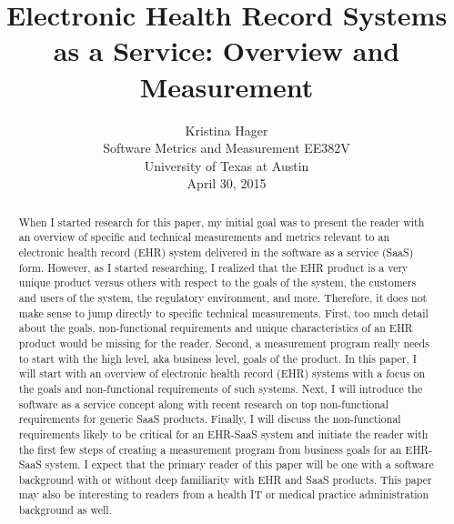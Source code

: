 \documentclass[10pt]{article}
\begin{document}
\title{Electronic Health Record Systems as a Service: Overview and Measurement}

\author{Kristina Hager\\
Software Metrics and Measurement EE382V\\
University of Texas at Austin\\
April 30, 2015\\
}


\maketitle
\thispagestyle{empty}

\begin{abstract}

When I started research for this paper, my initial goal was to present the reader with an overview of specific and technical measurements and metrics relevant to an electronic health record (EHR) system delivered in the software as a service (SaaS) form.
However, as I started researching, I realized that the EHR product is a very unique product versus others with respect to the goals of the system, the customers and users of the system, the regulatory environment, and more.
Therefore, it does not make sense to jump directly to specific technical measurements.
First, too much detail about the goals, non-functional requirements and unique characteristics of an EHR product would be missing for the reader.
Second, a measurement program really needs to start with the high level, aka business level, goals of the product.
In this paper, I will start with an overview of electronic health record (EHR) systems with a focus on the goals and non-functional requirements of such systems.
Next, I will introduce the software as a service concept along with recent research on top non-functional requirements for generic SaaS products.
Finally, I will discuss the non-functional requirements likely to be critical for an EHR-SaaS system and initiate the reader with the first few steps of creating a measurement program from business goals for an EHR-SaaS system.
I expect that the primary reader of this paper will be one with a software background with or without deep familiarity with EHR and SaaS products.
This paper may also be interesting to readers from a health IT or medical practice administration background as well.

\end{abstract}

\end{document}
